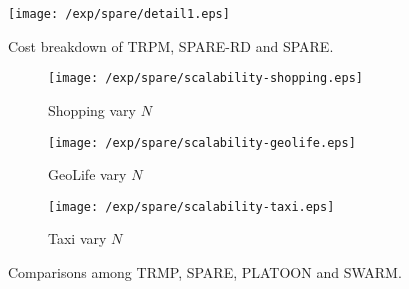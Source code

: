 
\begin{figure*}
\begin{minipage}{0.3\textwidth}
\texttt{[image: /exp/spare/detail1.eps]}
 \caption{Cost breakdown of TRPM, SPARE-RD and SPARE.}
    \label{exp:wl}
\end{minipage}
\begin{minipage}{0.74\textwidth}
\centering
	 \begin{subfigure}[b]{0.32\textwidth}
        \texttt{[image: /exp/spare/scalability-shopping.eps]}
        \caption{Shopping vary $N$}
    \end{subfigure} 
    \begin{subfigure}[b]{0.32\textwidth}
        \texttt{[image: /exp/spare/scalability-geolife.eps]}
        \caption{GeoLife vary $N$}
    \end{subfigure} 
    \begin{subfigure}[b]{0.32\textwidth}
        \texttt{[image: /exp/spare/scalability-taxi.eps]}
        \caption{Taxi vary $N$}
    \end{subfigure} 
 \caption{Comparisons among TRMP, SPARE, PLATOON and SWARM.}
 \label{exp:scalability}
\end{minipage}
\end{figure*}


